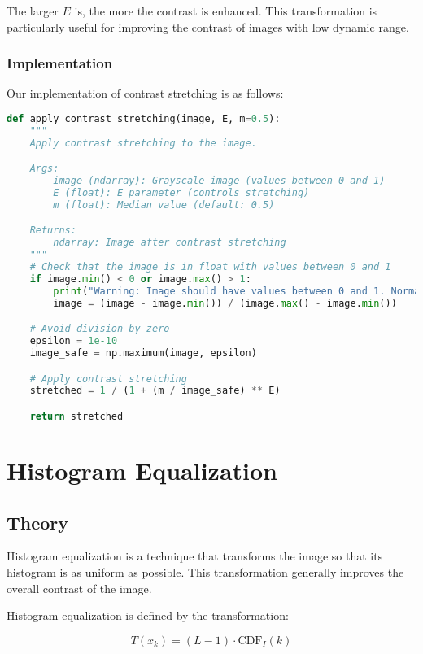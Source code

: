 \documentclass[12pt,a4paper]{article}
\begin{document}
The larger $E$ is, the more the contrast is enhanced. This transformation is particularly useful for improving the contrast of images with low dynamic range.

\subsubsection{Implementation}

Our implementation of contrast stretching is as follows:

\begin{lstlisting}[language=Python, caption=Contrast stretching implementation]
def apply_contrast_stretching(image, E, m=0.5):
    """
    Apply contrast stretching to the image.

    Args:
        image (ndarray): Grayscale image (values between 0 and 1)
        E (float): E parameter (controls stretching)
        m (float): Median value (default: 0.5)

    Returns:
        ndarray: Image after contrast stretching
    """
    # Check that the image is in float with values between 0 and 1
    if image.min() < 0 or image.max() > 1:
        print("Warning: Image should have values between 0 and 1. Normalization applied.")
        image = (image - image.min()) / (image.max() - image.min())

    # Avoid division by zero
    epsilon = 1e-10
    image_safe = np.maximum(image, epsilon)

    # Apply contrast stretching
    stretched = 1 / (1 + (m / image_safe) ** E)

    return stretched
\end{lstlisting}

\section{Histogram Equalization}

\subsection{Theory}

Histogram equalization is a technique that transforms the image so that its histogram is as uniform as possible. This transformation generally improves the overall contrast of the image.

Histogram equalization is defined by the transformation:

\begin{equation}
    T(x_k) = (L-1) \cdot \text{CDF}_I(k)
\end{equation}
\end{document}

